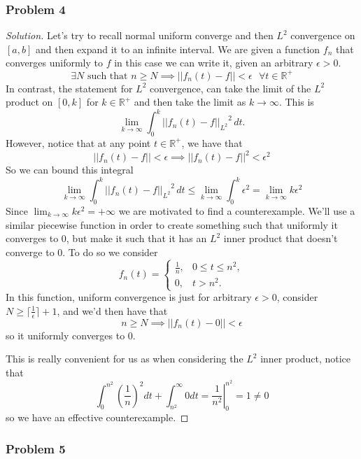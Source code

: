 \documentclass[11pt]{article}
\newcommand{\1}{\mathbf{1}}
\theoremstyle{definition}
\newenvironment{solution}{\begin{proof}[Solution]}{\end{proof}}
\begin{document}
\subsubsection*{Problem 4}
\begin{solution}
Let's try to recall normal uniform converge and then \(L^2\) convergence on \([a, b]\) and then expand it to an infinite
interval. 
We are given a function \(f_n\) that converges uniformly to \(f\) in this case we can write
it, given an arbitrary \(\epsilon > 0\).
\[\exists N \text{ such that } n \ge N \implies  ||f_n(t) - f|| < \epsilon \text{ } \forall t \in
\mathbb{R}^{+}\]
In contrast, the statement for \(L^2\) convergence, can take the limit of the \(L^2\)
product on \([0, k]\) for \(k \in \mathbb{R}^{+}\) and then take the limit as \(k \rightarrow
\infty\).
This is
\[
\lim_{k \to \infty} \int_{0}^{k} {||f_n(t) - f||_{L^2}}^2\,dt.
\]
However, notice that at any point \(t \in \mathbb{R}^{+}\), we have that \[||f_n(t) - f|| <
\epsilon \implies ||f_n(t) - f||^2 < \epsilon^2 \] 
So we can bound this integral \[\lim_{k\to\infty} \int_{0}^{k} {||f_n(t) -
f||_{L^2}}^2\, dt \le \lim_{k\to\infty} \int_{0}^{k} \epsilon^2 = \lim_{k\to\infty} k
\epsilon^2\]
Since \(\lim_{k\to\infty} k\epsilon^2 = +\infty\) we are motivated to find a
counterexample.
We'll use a similar piecewise function in order to create something such that uniformly
it converges to 0, but make it such that it has an \(L^2\) inner product that doesn't
converge to 0. To do so we consider \[
f_n(t)=
\begin{cases}
\frac{1}{n}, & 0 \leq t \leq n^2,\\
0, & t > n^2.
\end{cases}
\]
In this function, uniform convergence is just for arbitrary \(\epsilon > 0\), consider 
\(N \ge \lceil\frac{1}{\epsilon}\rceil + 1\), and we'd then have that \[n \ge N \implies ||f_n(t) - 0|| <\epsilon \] so it uniformly converges to 0.
\par This is really convenient for us as when considering the \(L^2\) inner product,
notice that \[\int_{0}^{n^2} \left(\frac{1}{n}\right)^2 dt  + \int_{n^2}^{\infty} 0 dt  = \left.\frac{1}{n^2} \right\rvert_{0}^{n^2} = 1 \ne 0\] 
    so we have an effective counterexample.

\end{solution}
\subsubsection*{Problem 5}
\end{document}
